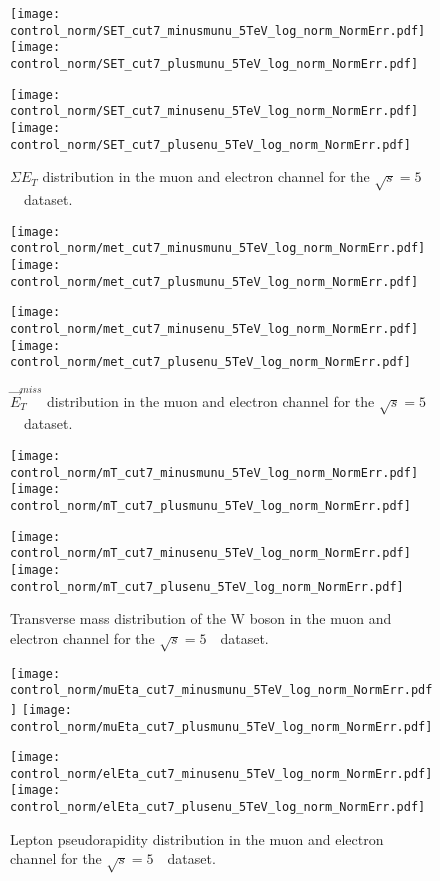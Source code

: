 \begin{figure}[h]
	\centering
	{\texttt{[image: control\_norm/SET\_cut7\_minusmunu\_5TeV\_log\_norm\_NormErr.pdf]}\label{f:set5}}
	{\texttt{[image: control\_norm/SET\_cut7\_plusmunu\_5TeV\_log\_norm\_NormErr.pdf]}\label{f:setpl}}
	
	{\texttt{[image: control\_norm/SET\_cut7\_minusenu\_5TeV\_log\_norm\_NormErr.pdf]}\label{f:}}
	{\texttt{[image: control\_norm/SET\_cut7\_plusenu\_5TeV\_log\_norm\_NormErr.pdf]}\label{f:}}
	\caption{$\Sigma{E_T}$ distribution in the muon and electron channel  for the $\sqrt{s} = 5$~\TeV\ dataset.}
\end{figure}
\newpage


\begin{figure}[h]
	\centering
	{\texttt{[image: control\_norm/met\_cut7\_minusmunu\_5TeV\_log\_norm\_NormErr.pdf]}\label{f:}}
	{\texttt{[image: control\_norm/met\_cut7\_plusmunu\_5TeV\_log\_norm\_NormErr.pdf]}\label{f:}}
	
	{\texttt{[image: control\_norm/met\_cut7\_minusenu\_5TeV\_log\_norm\_NormErr.pdf]}\label{f:}}
	{\texttt{[image: control\_norm/met\_cut7\_plusenu\_5TeV\_log\_norm\_NormErr.pdf]}\label{f:}}
	\caption{ $\vec{E}^{miss}_{T}$ distribution in the muon and electron channel  for the $\sqrt{s} = 5$~\TeV\ dataset.}
\end{figure}
\newpage



\begin{figure}[h]
	\centering
	{\texttt{[image: control\_norm/mT\_cut7\_minusmunu\_5TeV\_log\_norm\_NormErr.pdf]}\label{f:}}
	{\texttt{[image: control\_norm/mT\_cut7\_plusmunu\_5TeV\_log\_norm\_NormErr.pdf]}\label{f:}}
	
	{\texttt{[image: control\_norm/mT\_cut7\_minusenu\_5TeV\_log\_norm\_NormErr.pdf]}\label{f:}}
	{\texttt{[image: control\_norm/mT\_cut7\_plusenu\_5TeV\_log\_norm\_NormErr.pdf]}\label{f:}}
	\caption{  Transverse mass distribution of the W boson in the muon and electron channel  for the $\sqrt{s} = 5$~\TeV\ dataset. }\end{figure}
\newpage

\begin{figure}[h]
	\centering
	{\texttt{[image: control\_norm/muEta\_cut7\_minusmunu\_5TeV\_log\_norm\_NormErr.pdf]}\label{f:}}
	{\texttt{[image: control\_norm/muEta\_cut7\_plusmunu\_5TeV\_log\_norm\_NormErr.pdf]}\label{f:}}
	
	{\texttt{[image: control\_norm/elEta\_cut7\_minusenu\_5TeV\_log\_norm\_NormErr.pdf]}\label{f:}}
	{\texttt{[image: control\_norm/elEta\_cut7\_plusenu\_5TeV\_log\_norm\_NormErr.pdf]}\label{f:}}
	\caption{  Lepton pseudorapidity distribution in the muon and electron channel  for the $\sqrt{s} = 5$~\TeV\ dataset. }\end{figure}
\newpage

